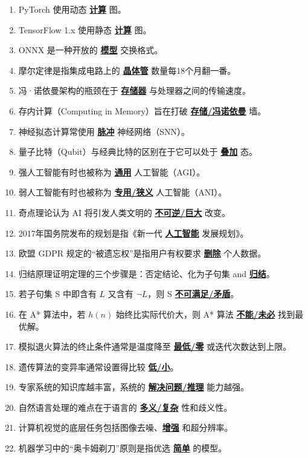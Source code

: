 \documentclass[12pt,a4paper,openany]{ctexbook}
\begin{document}
\begin{enumerate}[resume,leftmargin=2em,itemsep=1pt]
\item PyTorch 使用动态 \underline{\textbf{计算}} 图。
\item TensorFlow 1.x 使用静态 \underline{\textbf{计算}} 图。
\item ONNX 是一种开放的 \underline{\textbf{模型}} 交换格式。
\item 摩尔定律是指集成电路上的 \underline{\textbf{晶体管}} 数量每18个月翻一番。
\item 冯·诺依曼架构的瓶颈在于 \underline{\textbf{存储器}} 与处理器之间的传输速度。
\item 存内计算（Computing in Memory）旨在打破 \underline{\textbf{存储/冯诺依曼}} 墙。
\item 神经拟态计算常使用 \underline{\textbf{脉冲}} 神经网络（SNN）。
\item 量子比特（Qubit）与经典比特的区别在于它可以处于 \underline{\textbf{叠加}} 态。
\item 强人工智能有时也被称为 \underline{\textbf{通用}} 人工智能（AGI）。
\item 弱人工智能有时也被称为 \underline{\textbf{专用/狭义}} 人工智能（ANI）。
\item 奇点理论认为 AI 将引发人类文明的 \underline{\textbf{不可逆/巨大}} 改变。
\item 2017年国务院发布的规划是指《新一代 \underline{\textbf{人工智能}} 发展规划》。
\item 欧盟 GDPR 规定的“被遗忘权”是指用户有权要求 \underline{\textbf{删除}} 个人数据。
\item 归结原理证明定理的三个步骤是：否定结论、化为子句集 and \underline{\textbf{归结}}。
\item 若子句集 S 中即含有 $L$ 又含有 $\neg L$，则 S \underline{\textbf{不可满足/矛盾}}。
\item 在 A* 算法中，若 $h(n)$ 始终比实际代价大，则 A* 算法 \underline{\textbf{不能/未必}} 找到最优解。
\item 模拟退火算法的终止条件通常是温度降至 \underline{\textbf{最低/零}} 或迭代次数达到上限。
\item 遗传算法的变异率通常设置得比较 \underline{\textbf{低/小}}。
\item 专家系统的知识库越丰富，系统的 \underline{\textbf{解决问题/推理}} 能力越强。
\item 自然语言处理的难点在于语言的 \underline{\textbf{多义/复杂}} 性和歧义性。
\item 计算机视觉的底层任务包括图像去噪、\underline{\textbf{增强}} 和超分辨率。
\item 机器学习中的“奥卡姆剃刀”原则是指优选 \underline{\textbf{简单}} 的模型。

\end{enumerate}
\end{document}
